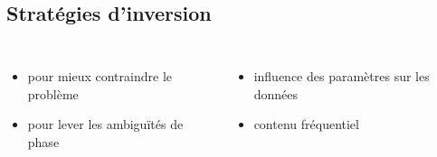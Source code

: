 \documentclass[10pt,xcolor=x11names,compress, notes=show]{beamer}%
\begin{document}
\subsection{Stratégies d'inversion}
\begin{frame}{\insertsubsectionhead}
\begin{small}
	\begin{columns}
	\begin{itemize}
		\item pour mieux contraindre le problème
		\item pour lever les ambiguïtés de phase
	\end{itemize}
	\begin{itemize}
		\item<2-> influence des paramètres sur les données %
		\item<4-> contenu fréquentiel
	\end{itemize}
		\centering
		\vspace{-0.5cm}
\end{columns}
\end{small}
\end{frame}
\end{document}
